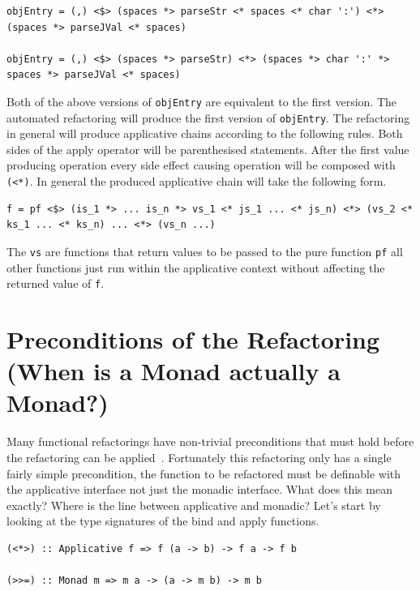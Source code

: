 \begin{lstlisting}[frame=tblr]
objEntry = (,) <$> (spaces *> parseStr <* spaces <* char ':') <*> (spaces *> parseJVal <* spaces)

objEntry = (,) <$> (spaces *> parseStr) <*> (spaces *> char ':' *> spaces *> parseJVal <* spaces)
\end{lstlisting}

Both of the above versions of \texttt{objEntry} are equivalent to the first version. The automated refactoring will produce the first version of \texttt{objEntry}. The refactoring in general will produce applicative chains according to the following rules. Both sides of the apply operator will be parenthesised statements. After the first value producing operation every side effect causing operation will be composed with \texttt{(<*)}. In general the produced applicative chain will take the following form.

\begin{lstlisting}[frame=tblr]
f = pf <$> (is_1 *> ... is_n *> vs_1 <* js_1 ... <* js_n) <*> (vs_2 <* ks_1 ... <* ks_n) ... <*> (vs_n ...)
\end{lstlisting}

The \texttt{vs} are functions that return values to be passed to the pure function \texttt{pf} all other functions just run within the applicative context without affecting the returned value of \texttt{f}.

\section{Preconditions of the Refactoring (When is a Monad actually a Monad?)}
\label{sec:appPrecons}

Many functional refactorings have non-trivial preconditions that must hold before the refactoring can be applied~\citep{refacTools}. Fortunately this refactoring only has a single fairly simple precondition, the function to be refactored must be definable with the applicative interface not just the monadic interface. What does this mean exactly? Where is the line between applicative and monadic? Let's start by looking at the type signatures of the bind and apply functions.

\begin{lstlisting}[frame=tblr]
(<*>) :: Applicative f => f (a -> b) -> f a -> f b

(>>=) :: Monad m => m a -> (a -> m b) -> m b
\end{lstlisting}  

